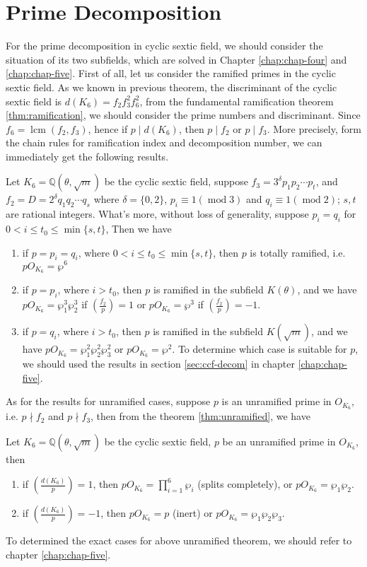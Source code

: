 \section{Prime Decomposition}\label{sec:primdsex}
For the prime decomposition in cyclic sextic field, we should consider the situation of its two subfields, which are solved in Chapter \ref{chap:chap-four} and \ref{chap:chap-five}. First of all, let us consider the ramified primes in the cyclic sextic field. As we known in previous theorem, the discriminant of the cyclic sextic field is $d(K_6)=f_2f_3^2f_6^2$, from the fundamental ramification theorem \ref{thm:ramification}, we should consider the prime numbers and discriminant. Since $f_6=\operatorname{lcm}(f_2,f_3)$, hence if $p\mid d(K_6)$, then $p\mid f_2$ or $p\mid f_3$. More precisely, form the chain rules for ramification index and decomposition number, we can immediately get the following results.
\begin{theorem}\label{thm:csf-ramified}
Let $K_6=\mathbb{Q}(\theta,\sqrt{m})$ be the cyclic sextic field, suppose $f_3=3^{\delta}p_1p_2\cdots p_t$, and $f_2=D=2^{\delta}q_1q_2\cdots q_s$ where $\delta=\{0,2\}$,
$p_i\equiv 1 (\operatorname{mod} 3)$ and $q_i\equiv 1 (\operatorname{mod} 2)$; $s,t$ are rational integers. What's more, without loss of generality, suppose $p_i=q_i$ for $0<i\leq t_0\leq \min{\{s,t\}}$, Then we have 
\begin{enumerate}
\item if $p=p_i=q_i$, where $0<i\leq t_0\leq \min{\{s,t\}}$, then $p$ is totally ramified, i.e. $pO_{K_6}=\wp^6$
\item if $p=p_i$, where $i>t_0$, then $p$ is ramified in the subfield $K(\theta)$, and we have $pO_{K_6}=\wp_1^3\wp_2^3$ if $\left(\frac{f_2}{p}\right)=1$ or $pO_{K_6}=\wp^3$ if $\left(\frac{f_2}{p}\right)=-1$.
\item if $p=q_i$, where $i>t_0$, then $p$ is ramified in the subfield $K(\sqrt{m})$, and we have $pO_{K_6}=\wp_1^2\wp_2^2\wp_3^2$ or $pO_{K_6}=\wp^2$. To determine which case is suitable for $p$, we should used the results in section \ref{sec:ccf-decom} in chapter \ref{chap:chap-five}.
\end{enumerate}
\end{theorem}

As for the results for unramified cases, suppose $p$ is an unramified prime in $O_{K_6}$, i.e. $p\nmid f_2$ and $p\nmid f_3$, then from the theorem \ref{thm:unramified}, we have 
\begin{theorem}\label{thm:csf-unramified}
Let $K_6=\mathbb{Q}(\theta,\sqrt{m})$ be the cyclic sextic field, $p$ be an unramified prime in $O_{K_6}$, then 
\begin{enumerate}
\item if $\left(\frac{d(K_6)}{p}\right)=1$, then $pO_{K_6}=\prod_{i=1}^6\wp_i$ (splits completely), or $pO_{K_6}=\wp_1\wp_2$. 
\item if $\left(\frac{d(K_6)}{p}\right)=-1$, then $pO_{K_6}=p$ (inert) or $pO_{K_6}=\wp_1\wp_2\wp_3$.
\end{enumerate}
\end{theorem}
To determined the exact cases for above unramified theorem, we should refer to chapter \ref{chap:chap-five}.
 

